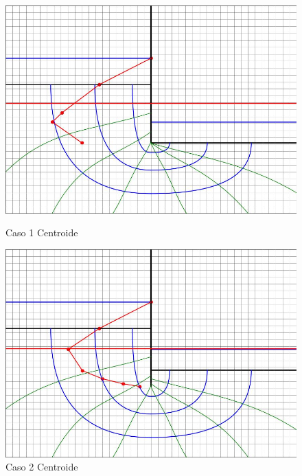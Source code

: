\begin{figure}[H]
    \centering
    \begin{minipage}{0.32\textwidth}
        \centering
        \includegraphics[width=\textwidth]{GRAFICOS/caso_1_centroide_y.jpg}
        \caption{Caso 1 Centroide}
    \end{minipage}
    \begin{minipage}{0.32\textwidth}
        \centering
        \includegraphics[width=\textwidth]{GRAFICOS/caso_2_centroide_y.jpg}
        \caption{Caso 2 Centroide}
    \end{minipage}
    \begin{minipage}{0.32\textwidth}
        \centering

\end{minipage}
\end{figure}
